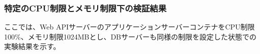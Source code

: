 \documentclass[../../../../main]{subfiles}
\begin{document}
    \subsubsection{特定のCPU制限とメモリ制限下の検証結果}\label{subsubsec:result-streaming-only-limit}

    ここでは、Web APIサーバーのアプリケーションサーバーコンテナをCPU制限100\%、メモリ制限1024MBとし、DBサーバーも同様の制限を設定した状態での実験結果を示す。

    

    

    

    

    
\end{document}
